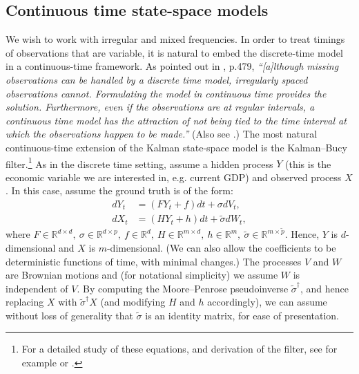 \documentclass[a4paper, 12pt]{article}
\theoremstyle{remark}
\begin{document}
\subsection{Continuous time state-space models}\label{sec:cts_kf}

We wish to work with irregular and mixed frequencies. In order to treat timings of observations that are variable, it is natural to embed the discrete-time model in a continuous-time framework. As pointed out in \citet{harvey1990forecasting}, p.479, \textit{``[a]lthough missing observations can be handled by a discrete time model, irregularly spaced observations cannot. Formulating the model in continuous time provides the solution. Furthermore, even if the observations are at regular intervals, a continuous time model has the attraction of not being tied to the time
interval at which the observations happen to be made.''} (Also see \citet{bergstrom1984hoe}.) The most natural continuous-time extension of the Kalman state-space model is the Kalman--Bucy filter.\footnote{For a detailed study of these equations, and derivation of the filter, see for example \citet{bain2008fundamentals} or \citet[Chapter 22]{cohen2015stochastic}.} As in the discrete time setting, assume a hidden process $Y$ (this is the economic variable we are interested in, e.g. current GDP) and observed process $X$. In this case, assume the ground truth is of the form:
\begin{align*}
    dY_t &= (FY_t+f)dt + \sigma dV_t,\\
    dX_t &= (H Y_t + h)dt + \tilde{\sigma} dW_t,
\end{align*}
where $F\in \mathbb{R}^{d\times d},\: \sigma \in \mathbb{R}^{d\times p},\: f\in \mathbb{R}^d,\: H\in \mathbb{R}^{m\times d},\: h\in \mathbb{R}^m,\: \tilde\sigma \in \mathbb{R}^{m\times \tilde p}$. Hence, $Y$ is $d$-dimensional and $X$ is $m$-dimensional. (We can also allow the coefficients to be deterministic functions of time, with minimal changes.) The processes $V$ and $W$ are Brownian motions and (for notational simplicity) we assume $W$ is independent of $V$. By computing the Moore--Penrose pseudoinverse $\tilde{\sigma}^\dagger$, and hence replacing $X$ with $\tilde{\sigma}^\dagger X$ (and modifying $H$ and $h$ accordingly), we can assume without loss of generality that $\tilde{\sigma}$ is an identity matrix, for ease of presentation.
\end{document}
